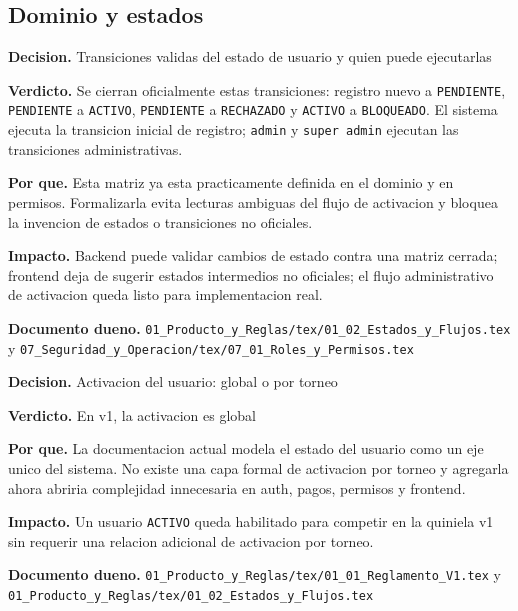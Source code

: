 \subsection{Dominio y estados}

\begin{docnote}
\textbf{Decision.} Transiciones validas del estado de usuario y quien puede ejecutarlas

\textbf{Verdicto.} Se cierran oficialmente estas transiciones: registro nuevo a \texttt{PENDIENTE}, \texttt{PENDIENTE} a \texttt{ACTIVO}, \texttt{PENDIENTE} a \texttt{RECHAZADO} y \texttt{ACTIVO} a \texttt{BLOQUEADO}. El sistema ejecuta la transicion inicial de registro; \texttt{admin} y \texttt{super admin} ejecutan las transiciones administrativas.

\textbf{Por que.} Esta matriz ya esta practicamente definida en el dominio y en permisos. Formalizarla evita lecturas ambiguas del flujo de activacion y bloquea la invencion de estados o transiciones no oficiales.

\textbf{Impacto.} Backend puede validar cambios de estado contra una matriz cerrada; frontend deja de sugerir estados intermedios no oficiales; el flujo administrativo de activacion queda listo para implementacion real.

\textbf{Documento dueno.} \texttt{01\_Producto\_y\_Reglas/tex/01\_02\_Estados\_y\_Flujos.tex} y \texttt{07\_Seguridad\_y\_Operacion/tex/07\_01\_Roles\_y\_Permisos.tex}
\end{docnote}

\begin{docnote}
\textbf{Decision.} Activacion del usuario: global o por torneo

\textbf{Verdicto.} En v1, la activacion es global

\textbf{Por que.} La documentacion actual modela el estado del usuario como un eje unico del sistema. No existe una capa formal de activacion por torneo y agregarla ahora abriria complejidad innecesaria en auth, pagos, permisos y frontend.

\textbf{Impacto.} Un usuario \texttt{ACTIVO} queda habilitado para competir en la quiniela v1 sin requerir una relacion adicional de activacion por torneo.

\textbf{Documento dueno.} \texttt{01\_Producto\_y\_Reglas/tex/01\_01\_Reglamento\_V1.tex} y \texttt{01\_Producto\_y\_Reglas/tex/01\_02\_Estados\_y\_Flujos.tex}
\end{docnote}

